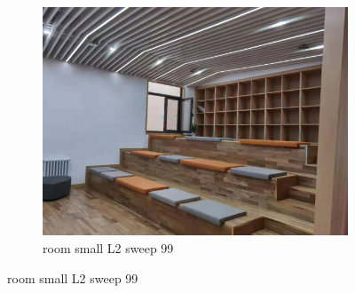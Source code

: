 \documentclass[11pt]{article}
\begin{document}
\begin{figure}[ht!]
\begin{subfigure}[]{0.333\linewidth}
        \centering
        \includegraphics[width=\linewidth]{fig/restoration/room_small/L2/gibbs_99.jpg}
        \caption{room small L2 sweep 99}
    \end{subfigure}%
\end{figure}
\end{document}

